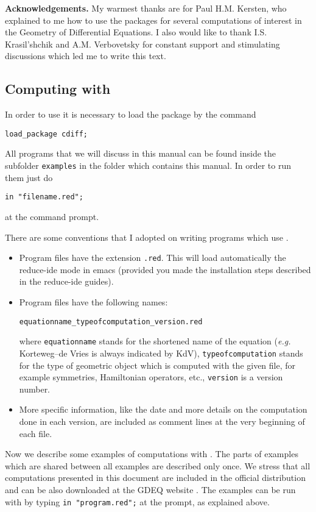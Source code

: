 \textbf{Acknowledgements.} My warmest thanks are for Paul H.M. Kersten, who
explained to me how to use the \cdiff packages for several computations of
interest in the Geometry of Differential Equations. I also would like to thank
I.S. Krasil'shchik and A.M. Verbovetsky for constant support and stimulating
discussions which led me to write this text.

\subsection{Computing with \cdiff}

In order to use \cdiff it is necessary to load the package by the command
\begin{verbatim}
load_package cdiff;
\end{verbatim}

All programs that we will discuss in this manual can be found inside the
subfolder \texttt{examples} in the folder which contains this manual. In order
to run them just do
\begin{verbatim}
in "filename.red";
\end{verbatim}
at the \REDUCE command prompt.

There are some conventions that I adopted on writing programs which use \cdiff.
\begin{itemize}
\item Program files have the extension \texttt{.red}. This will load
  automatically the reduce-ide mode in emacs (provided you made the
  installation steps described in the reduce-ide guides).
\item Program files have the following names:
  \begin{center}
    \texttt{equationname\_typeofcomputation\_version.red}
  \end{center}
  where \texttt{equationname} stands for the shortened name of the equation
  (\emph{e.g.} Korteweg--de Vries is always indicated by KdV),
  \texttt{typeofcomputation} stands for the type of geometric object which is
  computed with the given file, for example symmetries, Hamiltonian operators,
  etc., \texttt{version} is a version number.
\item More specific information, like the date and more details on the
  computation done in each version, are included as comment lines at the very
  beginning of each file.
\end{itemize}

Now we describe some examples of computations with \cdiff. The parts of
examples which are shared between all examples are described only once. We
stress that all computations presented in this document are included in the
official \REDUCE distribution and can be also downloaded at the GDEQ website
\cite{gdeq}. The examples can be run with \REDUCE by typing \texttt{in
  "program.red";} at the \REDUCE prompt, as explained above.

